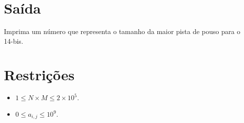 %
%

\section*{Saída}

Imprima um número que representa o tamanho da maior pista de pouso para o 14-bis.

\section*{Restrições}

\begin{itemize}
  \item $1 \leq N \times M \leq 2\times 10^5$.
  \item $0 \leq a_{i, j} \leq 10^9$.
\end{itemize}


\exemplo
